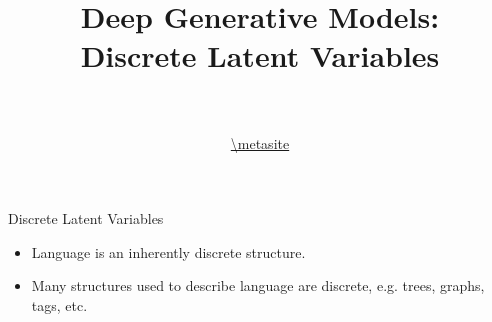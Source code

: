 \documentclass[14pt]{beamer}
\title[Discrete DGMs]{Deep Generative Models: \\
Discrete Latent Variables}
\date{}
\author[VI Tutorial @ \metahost]{ \metaauthor \\ 
~\\
\url{\metasite}
}
\institute[]{\metaack}
\begin{document}
\frame{\titlepage}

\begin{frame}{Discrete Latent Variables}
    \begin{itemize}
    	\item Language is an inherently discrete structure. \pause
    	\item Many structures used to describe language are discrete, e.g. trees, graphs, tags, etc.
    \end{itemize}
\end{frame}

\frame{\tableofcontents}


\end{document}
